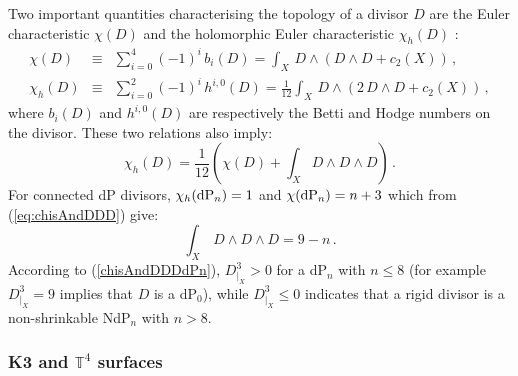 \documentclass[11pt,a4paper]{article}
\newcommand{\bea}{\begin{eqnarray}}
\newcommand{\eea}{\end{eqnarray}}
\newcommand{\be}{\begin{equation}}
\newcommand{\ee}{\end{equation}}
\def\T{{\mathbb T}}
\begin{document}
Two important quantities characterising the topology of a divisor $D$ are the Euler characteristic $\chi(D)$ and the holomorphic Euler characteristic $\chi_h(D)$ \cite{Blumenhagen:2008zz}:
\bea
\chi(D) &\equiv& \sum_{i=0}^4 {(-1)}^i \, b_i(D)  =  \int_X \, D \wedge\left( D \wedge D + c_2(X) \right)\,, \label{chi} \\
\chi_h({D}) &\equiv& \sum_{i=0}^2 {(-1)}^i \, h^{i,0}(D)  = \frac{1}{12} \int_X \, D \wedge \left(2 \, D\wedge D + c_2(X) \right)\,, 
\label{chih}
\eea
where $b_i(D)$ and $h^{i,0}(D)$ are respectively the Betti and Hodge numbers on the divisor. These two relations also imply:
\be
\chi_h(D) = \frac{1}{12}\left(\chi(D) + \int_X D \wedge D \wedge D\right) \,.
\label{eq:chisAndDDD}
\ee
For connected dP divisors, $\chi_h({\rm dP}_n) = 1$ and $\chi({\rm dP}_n) = n+3$ which from (\ref{eq:chisAndDDD}) give: 
\be
\int_X \, D \wedge D \wedge D = 9-n\,.
\label{chisAndDDDdPn}
\ee
According to (\ref{chisAndDDDdPn}), $D^3_{|_X}>0$ for a dP$_n$ with $n\leq 8$ (for example $D^3_{|_X} = 9$ implies that $D$ is a dP$_0$), while $D^3_{|_X}\leq 0$ indicates that a rigid divisor is a non-shrinkable NdP$_n$ with $n>8$.

\subsubsection*{K3 and $\T^4$ surfaces}
\end{document}
